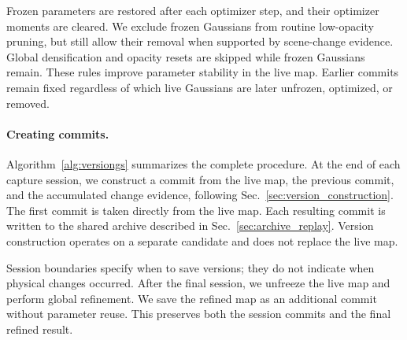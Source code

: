 Frozen parameters are restored after each optimizer step,
and their optimizer moments are cleared.
We exclude frozen Gaussians from routine low-opacity pruning,
but still allow their removal when supported by scene-change evidence.
Global densification and opacity resets are skipped while
frozen Gaussians remain.
These rules improve parameter stability in the live map.
Earlier commits remain fixed regardless of which live Gaussians
are later unfrozen, optimized, or removed.

\paragraph{Creating commits.}
Algorithm~\ref{alg:versiongs} summarizes the complete procedure.
At the end of each capture session, we construct a commit from
the live map, the previous commit, and the accumulated change evidence,
following Sec.~\ref{sec:version_construction}.
The first commit is taken directly from the live map.
Each resulting commit is written to the shared archive described
in Sec.~\ref{sec:archive_replay}.
Version construction operates on a separate candidate and does not
replace the live map.

Session boundaries specify when to save versions;
they do not indicate when physical changes occurred.
After the final session, we unfreeze the live map and perform
global refinement.
We save the refined map as an additional commit without
parameter reuse.
This preserves both the session commits and the final refined result.




